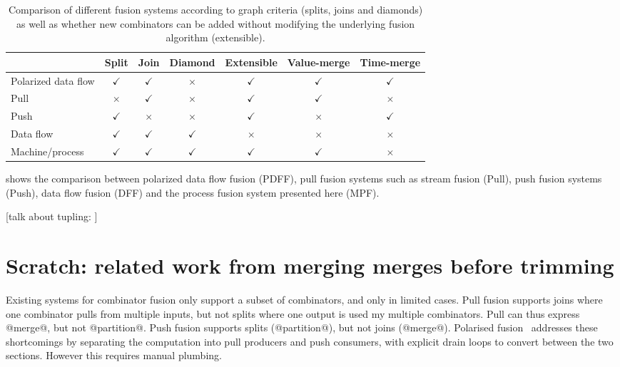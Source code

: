 \begin{table}
\begin{center}
\begin{tabular}{|l||c|c|c|c|c|c|}
\hline
 & Split & Join & Diamond & Extensible & Value-merge & Time-merge \\
\hline
\hline
Polarized data flow
  & $\checkmark$ & $\checkmark$ & $\times$ & $\checkmark$ & $\checkmark$& $\checkmark$ \\
Pull
  & $\times$ & $\checkmark$ & $\times$ & $\checkmark$ & $\checkmark$ & $\times$ \\
Push
  & $\checkmark$ & $\times$ & $\times$ & $\checkmark$ & $\times$ & $\checkmark$ \\
Data flow
  & $\checkmark$ & $\checkmark$ & $\checkmark$ & $\times$ & $\times$ & $\times$ \\
Machine/process
  & $\checkmark$ & $\checkmark$ & $\checkmark$ & $\checkmark$ & $\checkmark$ & $\times$ \\
\hline
\end{tabular}
\end{center}
\caption[Comparison between fusion systems]{Comparison of different fusion systems according to graph criteria (splits, joins and diamonds) as well as whether new combinators can be added without modifying the underlying fusion algorithm (extensible).}
\label{03-body/02-process/01-background/comparison/table}
\end{table}

 shows the comparison between polarized data flow fusion (PDFF), pull fusion systems such as stream fusion (Pull), push fusion systems (Push), data flow fusion (DFF) and the process fusion system presented here (MPF).

[talk about tupling: \cite{hu1996deriving,hu1996cheap,hu1996extension,hu1997tupling,hu2005program,bransen2014exploiting,chiba2010program,launchbury1995warm}]

\section{Scratch: related work from merging merges before trimming}

Existing systems for combinator fusion only support a subset of combinators, and only in limited cases.
Pull fusion supports joins where one combinator pulls from multiple inputs, but not splits where one output is used my multiple combinators.
Pull can thus express @merge@, but not @partition@.
Push fusion supports splits (@partition@), but not joins (@merge@).
Polarised fusion~\cite{lippmeier2016polarized} addresses these shortcomings by separating the computation into pull producers and push consumers, with explicit drain loops to convert between the two sections. However this requires manual plumbing.

